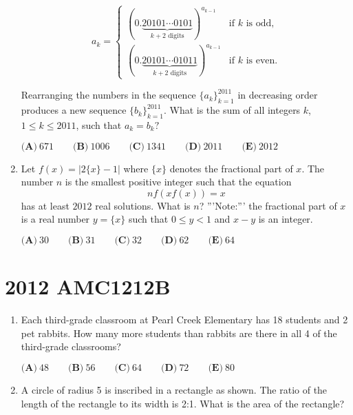 \documentclass{article}
\begin{document}
\begin{enumerate}[label=\arabic*., itemsep=0.5em]
\begin{equation*}
a_k=\begin{cases}
(0.\underbrace{20101\cdots 0101}_{k+2\text{ digits}})^{a_{k-1}} & \text{if }k\text{ is odd,}\\
(0.\underbrace{20101\cdots 01011}_{k+2\text{ digits}})^{a_{k-1}}& \text{if }k\text{ is even.}
\end{cases}
\end{equation*}


Rearranging the numbers in the sequence  $\{a_k\}_{k=1}^{2011}$ in decreasing order produces a new sequence  $\{b_k\}_{k=1}^{2011}$.  What is the sum of all integers $k$, $1\le k \le 2011$, such that $a_k=b_k?$

$ \textbf{(A)}\ 671\qquad\textbf{(B)}\ 1006\qquad\textbf{(C)}\ 1341\qquad\textbf{(D)}\ 2011\qquad\textbf{(E)}\ 2012 $\par \vspace{0.5em}\item Let $f(x)=|2\{x\}-1|$ where $\{x\}$ denotes the fractional part of $x$.  The number $n$ is the smallest positive integer such that the equation 
\begin{equation*}
nf(xf(x))=x
\end{equation*}
 has at least $2012$ real solutions.  What is $n$?  '''Note:''' the fractional part of $x$ is a real number $y=\{x\}$ such that $0\le y<1$ and $x-y$ is an integer.

$ \textbf{(A)}\ 30\qquad\textbf{(B)}\ 31\qquad\textbf{(C)}\ 32\qquad\textbf{(D)}\ 62\qquad\textbf{(E)}\ 64 $\par \vspace{0.5em}\end{enumerate}\newpage\section*{2012 AMC1212B}\begin{enumerate}[label=\arabic*., itemsep=0.5em]\item Each third-grade classroom at Pearl Creek Elementary has 18 students and 2 pet rabbits. How many more students than rabbits are there in all 4 of the third-grade classrooms?

$ \textbf{(A)}\ 48\qquad\textbf{(B)}\ 56\qquad\textbf{(C)}\ 64\qquad\textbf{(D)}\ 72\qquad\textbf{(E)}\ 80 $\par \vspace{0.5em}\item A circle of radius 5 is inscribed in a rectangle as shown. The ratio of the length of the rectangle to its width is 2:1. What is the area of the rectangle?


\end{enumerate}
\end{document}
